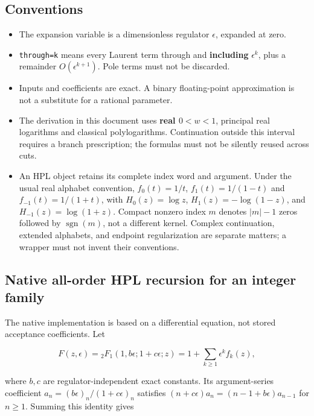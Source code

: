 \documentclass[
  11pt,
]{article}
\providecommand{\tightlist}{%
  \setlength{\itemsep}{0pt}\setlength{\parskip}{0pt}}
\begin{document}
\subsection{Conventions}\label{conventions}

\begin{itemize}
\tightlist
\item
  The expansion variable is a dimensionless regulator \(\epsilon\),
  expanded at zero.
\item
  \texttt{through=k} means every Laurent term through and
  \textbf{including} \(\epsilon^k\), plus a remainder
  \(O(\epsilon^{k+1})\). Pole terms must not be discarded.
\item
  Inputs and coefficients are exact. A binary floating-point
  approximation is not a substitute for a rational parameter.
\item
  The derivation in this document uses \textbf{real \(0<w<1\)},
  principal real logarithms and classical polylogarithms. Continuation
  outside this interval requires a branch prescription; the formulas
  must not be silently reused across cuts.
\item
  An HPL object retains its complete index word and argument. Under the
  usual real alphabet convention, \(f_0(t)=1/t\), \(f_1(t)=1/(1-t)\) and
  \(f_{-1}(t)=1/(1+t)\), with \(H_0(z)=\log z\), \(H_1(z)=-\log(1-z)\),
  and \(H_{-1}(z)=\log(1+z)\). Compact nonzero index \(m\) denotes
  \(|m|-1\) zeros followed by \(\operatorname{sgn}(m)\), not a different
  kernel. Complex continuation, extended alphabets, and endpoint
  regularization are separate matters; a wrapper must not invent their
  conventions.
\end{itemize}

\subsection{Native all-order HPL recursion for an integer
family}\label{native-all-order-hpl-recursion-for-an-integer-family}

The native implementation is based on a differential equation, not
stored acceptance coefficients. Let

\[F(z,\epsilon)={}_2F_1(1,b\epsilon;1+c\epsilon;z)
=1+\sum_{k\geq1}\epsilon^k f_k(z),\]

where \(b,c\) are regulator-independent exact constants. Its
argument-series coefficient \(a_n=(b\epsilon)_n/(1+c\epsilon)_n\)
satisfies \((n+c\epsilon)a_n=(n-1+b\epsilon)a_{n-1}\) for \(n\geq1\).
Summing this identity gives
\end{document}
